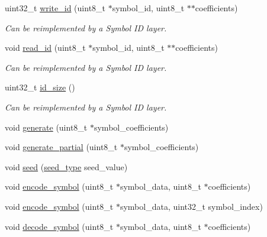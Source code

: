 \begin{DoxyCompactItemize}
uint32\-\_\-t \hyperlink{group__symbol__id__api_ga76aeaeeeafe38e9d4ef34a3395a0f3a9}{write\-\_\-id} (uint8\-\_\-t $\ast$symbol\-\_\-id, uint8\-\_\-t $\ast$$\ast$coefficients)
\begin{DoxyCompactList}\small\item\em Can be reimplemented by a Symbol I\-D layer. \end{DoxyCompactList}\item 
void \hyperlink{group__symbol__id__api_ga8df39a52500dd9c57d41af23882e8b60}{read\-\_\-id} (uint8\-\_\-t $\ast$symbol\-\_\-id, uint8\-\_\-t $\ast$$\ast$coefficients)
\begin{DoxyCompactList}\small\item\em Can be reimplemented by a Symbol I\-D layer. \end{DoxyCompactList}\item 
uint32\-\_\-t \hyperlink{group__symbol__id__api_ga382b6aceb7bc0139f35005d2fba76dfa}{id\-\_\-size} ()
\begin{DoxyCompactList}\small\item\em Can be reimplemented by a Symbol I\-D layer. \end{DoxyCompactList}\item 
void \hyperlink{group__coefficient__generator__api_gaf9f828a98483445a8ccf785e3a671cb3}{generate} (uint8\-\_\-t $\ast$symbol\-\_\-coefficients)
\item 
void \hyperlink{group__coefficient__generator__api_ga295e2fc5a74a92ef2281549a31379ba5}{generate\-\_\-partial} (uint8\-\_\-t $\ast$symbol\-\_\-coefficients)
\begin{DoxyCompactList}\small\item\em \end{DoxyCompactList}\item 
void \hyperlink{group__coefficient__generator__api_ga4afaaccc0d847e2c8ba021cc4e8c9672}{seed} (\hyperlink{classlayer_abd92e03d53ae960a9ef1e7a63fa06ccb}{seed\-\_\-type} seed\-\_\-value)
\item 
void \hyperlink{group__encoder__api_gaf28d3c1b82242263733ed082b1e10915}{encode\-\_\-symbol} (uint8\-\_\-t $\ast$symbol\-\_\-data, uint8\-\_\-t $\ast$coefficients)
\item 
void \hyperlink{group__encoder__api_ga77de1761c1eb25f5e5df3a0d341163ef}{encode\-\_\-symbol} (uint8\-\_\-t $\ast$symbol\-\_\-data, uint32\-\_\-t symbol\-\_\-index)
\item 
void \hyperlink{group__decoder__api_gae28d93bf78534b4f4f4052ad6b1f7a4d}{decode\-\_\-symbol} (uint8\-\_\-t $\ast$symbol\-\_\-data, uint8\-\_\-t $\ast$coefficients)

\end{DoxyCompactItemize}
